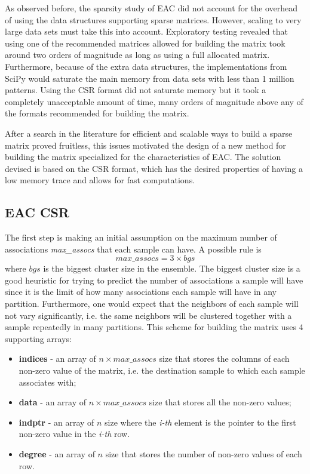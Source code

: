 As observed before, the sparsity study of EAC \cite{Lourenco2010} did not account for the overhead of using the data structures supporting sparse matrices.
However, scaling to very large data sets must take this into account.
Exploratory testing revealed that using one of the recommended matrices allowed for building the matrix took around two orders of magnitude as long as using a full allocated matrix.
Furthermore, because of the extra data structures, the implementations from SciPy would saturate the main memory from data sets with less than 1 million patterns.
Using the CSR format did not saturate memory but it took a completely unacceptable amount of time, many orders of magnitude above any of the formats recommended for building the matrix.

After a search in the literature for efficient and scalable ways to build a sparse matrix proved fruitless, this issues motivated the design of a new method for building the matrix specialized for the characteristics of EAC.
The solution devised is based on the CSR format, which has the desired properties of having a low memory trace and allows for fast computations.

\subsection{EAC CSR}

The first step is making an initial assumption on the maximum number of associations \emph{max\_assocs} that each sample can have.
A possible rule is $$max\_assocs = 3 \times bgs$$ where $bgs$ is the biggest cluster size in the ensemble.
The biggest cluster size is a good heuristic for trying to predict the number of associations a sample will have since it is the limit of how many associations each sample will have in any partition.
Furthermore, one would expect that the neighbors of each sample will not vary significantly, i.e. the same neighbors will be clustered together with a sample repeatedly in many partitions.
This scheme for building the matrix uses 4 supporting arrays:

\begin{itemize}
	\item \textbf{indices} - an array of $n \times max\_assocs$ size that stores the columns of each non-zero value of the matrix, i.e. the destination sample to which each sample associates with;
	\item \textbf{data} - an array of $n \times max\_assocs$ size that stores all the non-zero values;
	\item \textbf{indptr} - an array of $n$ size where the \emph{i-th} element is the pointer to the first non-zero value in the \emph{i-th} row.
	\item \textbf{degree} - an array of $n$ size that stores the number of non-zero values of each row.
\end{itemize}

